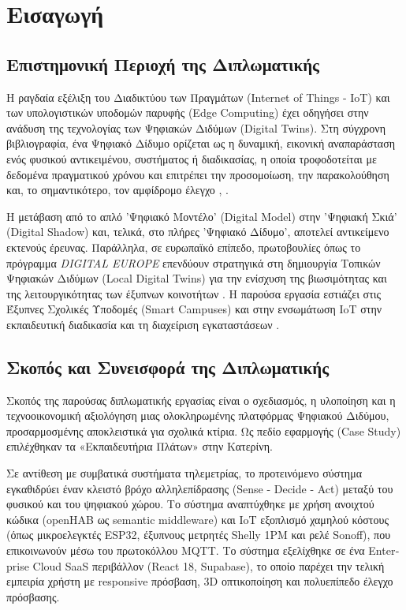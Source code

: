 \chapter{Εισαγωγή}

\section{Επιστημονική Περιοχή της Διπλωματικής}
Η ραγδαία εξέλιξη του Διαδικτύου των Πραγμάτων (\textlatin{Internet of Things - IoT}) και των υπολογιστικών υποδομών παρυφής (\textlatin{Edge Computing}) έχει οδηγήσει στην ανάδυση της τεχνολογίας των Ψηφιακών Διδύμων (\textlatin{Digital Twins}). Στη σύγχρονη βιβλιογραφία, ένα Ψηφιακό Δίδυμο ορίζεται ως η δυναμική, εικονική αναπαράσταση ενός φυσικού αντικειμένου, συστήματος ή διαδικασίας, η οποία τροφοδοτείται με δεδομένα πραγματικού χρόνου και επιτρέπει την προσομοίωση, την παρακολούθηση και, το σημαντικότερο, τον αμφίδρομο έλεγχο \cite{Grieves2017}, \cite{Han2022}.

Η μετάβαση από το απλό 'Ψηφιακό Μοντέλο' (\textlatin{Digital Model}) στην 'Ψηφιακή Σκιά' (\textlatin{Digital Shadow}) και, τελικά, στο πλήρες 'Ψηφιακό Δίδυμο', αποτελεί αντικείμενο εκτενούς έρευνας. Παράλληλα, σε ευρωπαϊκό επίπεδο, πρωτοβουλίες όπως το πρόγραμμα \textit{\textlatin{DIGITAL EUROPE}} επενδύουν στρατηγικά στη δημιουργία Τοπικών Ψηφιακών Διδύμων (\textlatin{Local Digital Twins}) για την ενίσχυση της βιωσιμότητας και της λειτουργικότητας των έξυπνων κοινοτήτων \cite{EuropeanCommission2023}. Η παρούσα εργασία εστιάζει στις Έξυπνες Σχολικές Υποδομές (\textlatin{Smart Campuses}) και στην ενσωμάτωση \textlatin{IoT} στην εκπαιδευτική διαδικασία και τη διαχείριση εγκαταστάσεων \cite{Balla2023, Barros2024, Evangelou2022, Cui2023, EUParliament2024}.

\section{Σκοπός και Συνεισφορά της Διπλωματικής}
Σκοπός της παρούσας διπλωματικής εργασίας είναι ο σχεδιασμός, η υλοποίηση και η τεχνοοικονομική αξιολόγηση μιας ολοκληρωμένης πλατφόρμας Ψηφιακού Διδύμου, προσαρμοσμένης αποκλειστικά για σχολικά κτίρια. Ως πεδίο εφαρμογής (\textlatin{Case Study}) επιλέχθηκαν τα «Εκπαιδευτήρια Πλάτων» στην Κατερίνη.

Σε αντίθεση με συμβατικά συστήματα τηλεμετρίας, το προτεινόμενο σύστημα εγκαθιδρύει έναν κλειστό βρόχο αλληλεπίδρασης (\textlatin{Sense - Decide - Act}) μεταξύ του φυσικού και του ψηφιακού χώρου. Το σύστημα αναπτύχθηκε με χρήση ανοιχτού κώδικα (\textlatin{openHAB} ως \textlatin{semantic middleware}) και IoT εξοπλισμό χαμηλού κόστους (όπως μικροελεγκτές \textlatin{ESP32}, έξυπνους μετρητές \textlatin{Shelly 1PM} και ρελέ \textlatin{Sonoff}), που επικοινωνούν μέσω του πρωτοκόλλου \textlatin{MQTT}. Το σύστημα εξελίχθηκε σε ένα \textlatin{Enterprise Cloud SaaS} περιβάλλον (\textlatin{React 18}, \textlatin{Supabase}), το οποίο παρέχει την τελική εμπειρία χρήστη με \textlatin{responsive} πρόσβαση, \textlatin{3D} οπτικοποίηση και πολυεπίπεδο έλεγχο πρόσβασης.

